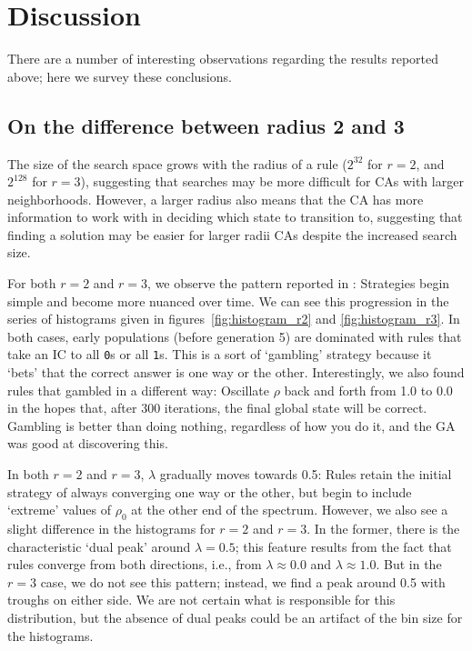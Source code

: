 \section{Discussion} \label{discussion}

There are a number of interesting observations regarding the results reported above; here we survey these 
conclusions.

\subsection{On the difference between radius 2 and 3}

The size of the search space grows with the radius of a rule ($2^{32}$ for $r = 2$, and $2^{128}$ for $r = 3$), suggesting 
that searches may be more difficult for CAs with larger neighborhoods. However, a larger radius also means that the CA has more information 
to work with in deciding which state to transition to, suggesting that finding a solution may be easier for larger radii CAs despite the increased 
search size.

For both $r = 2$ and $r = 3$, we observe the pattern reported in \cite{Mitchell:1994:ECA:186092.186116}: Strategies begin simple and become 
more nuanced over time. We can see this progression in the series of histograms given in figures~\ref{fig:histogram_r2} 
and \ref{fig:histogram_r3}. In both cases, early populations (before generation 5) are dominated with rules that take an IC to all \texttt{0}s or 
all \texttt{1}s. This is a sort of `gambling' strategy because it `bets' that the correct answer 
is one way or the other. Interestingly, we also found rules that gambled in a different way: Oscillate $\rho$ back and forth from 1.0 to 0.0 in the hopes 
that, after 300 iterations, the final global state will be correct. Gambling is better than doing nothing, regardless of how you do it, and the GA 
was good at discovering this.

In both $r = 2$ and $r = 3$, $\lambda$ gradually moves towards 0.5: Rules retain the initial strategy of always converging one way or the other, but begin to include `extreme' values of $\rho_0$ at the other end of the spectrum. However, we also see a slight difference in the histograms for $r = 2$ and 
$r = 3$. In the former, there is the characteristic `dual peak' around $\lambda = 0.5$; this feature results from the fact that rules converge from both directions, 
i.e., from $\lambda \approx 0.0$ and $\lambda \approx 1.0$. But in the $r = 3$ case, we do not see this pattern; instead, we find a peak around 0.5 
with troughs on either side. We are not certain what is responsible for this distribution, but the absence of dual peaks could be an artifact of the 
bin size for the histograms.

